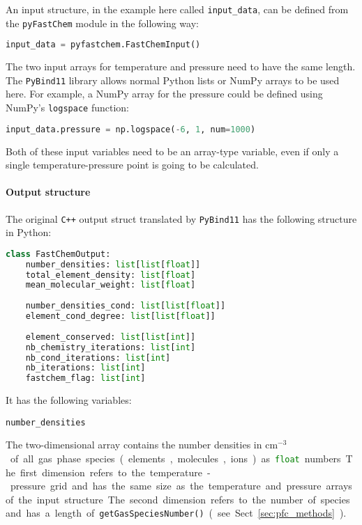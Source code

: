 \documentclass[numbers=noenddot]{aux/fcmanual}
\newcommand{\pfc}{\texttt{pyFastChem}\xspace}
\newcommand{\cpp}{\ttt{C++}\xspace}
\newcommand{\pb}{\texttt{PyBind11}\xspace}
\newcommand{\ttt}[1]{\texttt {#1}}
\begin{document}
\bigbreak

An input structure, in the example here called \lstinline!input_data!, can be defined from the \pfc module in the following way:
\begin{lstlisting}[language=Python]
	input_data = pyfastchem.FastChemInput()
\end{lstlisting}

The two input arrays for temperature and pressure need to have the same length. The \pb library allows normal Python lists or NumPy arrays to be used here. For example, a NumPy array for the pressure could be defined using NumPy's \lstinline!logspace! function:

\begin{lstlisting}[language=Python]
  input_data.pressure = np.logspace(-6, 1, num=1000)
\end{lstlisting}
Both of these input variables need to be an array-type variable, even if only a single temperature-pressure point is going to be calculated.



\paragraph{Output structure}

The original \cpp output struct translated by \pb has the following structure in Python:
\begin{lstlisting}[language=Python]
  class FastChemOutput:
    number_densities: list[list[float]]
    total_element_density: list[float]
    mean_molecular_weight: list[float]
	
    number_densities_cond: list[list[float]]
    element_cond_degree: list[list[float]]
	
    element_conserved: list[list[int]]
    nb_chemistry_iterations: list[int]
    nb_cond_iterations: list[int]
    nb_iterations: list[int]
    fastchem_flag: list[int]
\end{lstlisting}

It has the following variables:

\lstinline!number_densities!
\begin{addmargin}[25pt]{0pt}
	The two-dimensional array contains the number densities in \unit{cm$^{-3}$} of all gas phase species (elements, molecules, ions) as \lstinline[language=Python]!float! numbers. The first dimension refers to the temperature-pressure grid and has the same size as the temperature and pressure arrays of the input structure. The second dimension refers to the number of species and has a length of \lstinline!getGasSpeciesNumber()! (see Sect. \ref{sec:pfc_methods}).
\end{addmargin}
\end{document}
